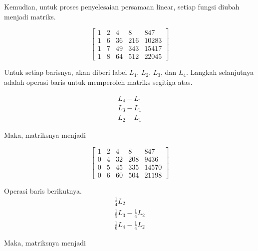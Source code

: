 Kemudian, untuk proses penyelesaian persamaan linear, setiap fungsi diubah menjadi matriks.

\begin{center}
	\setlength\arraycolsep{15pt}
	\[
	\begin{bmatrix}
			1 	& 2 	& 4 	& 8 		& 847 		\\[1em]
			1 	& 6 	& 36 	& 216 	& 10283		\\[1em]
			1 	& 7 	& 49 	& 343 	& 15417		\\[1em]
			1 	& 8 	& 64 	& 512 	& 22045
	\end{bmatrix}
	\]
\end{center}

Untuk setiap barisnya, akan diberi label \begin{math}L_1\end{math}, \begin{math}L_2\end{math}, \begin{math}L_3\end{math}, dan \begin{math}L_4\end{math}. Langkah selanjutnya adalah operasi baris untuk memperoleh matriks segitiga atas.

\begin{align*}
	L_4 - L_1 \\
	L_3 - L_1 \\
	L_2 - L_1
\end{align*}

Maka, matriksnya menjadi

\begin{center}
	\setlength\arraycolsep{15pt}
	\[
	\begin{bmatrix}
			1 	& 2 	& 4 	& 8 		& 847 		\\[1em]
			0 	& 4 	& 32 	& 208 	& 9436		\\[1em]
			0 	& 5 	& 45 	& 335 	& 14570		\\[1em]
			0 	& 6 	& 60 	& 504 	& 21198
	\end{bmatrix}
	\]
\end{center}

Operasi baris berikutnya.
\begin{align*}
	\frac{1}{4}L_2 \\
	\frac{1}{5}L_3 - \frac{1}{4}L_2 \\
	\frac{1}{6}L_4 - \frac{1}{4}L_2
\end{align*}

Maka, matriksnya menjadi

